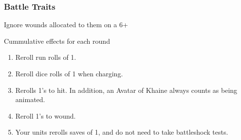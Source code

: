 \hypertarget{battle-traits}{%
    \subsubsection{Battle Traits}\label{battle-traits}}
\begin{description}[align=left]
    \item [\htarget{fanatical-faith}{Fanatical Faith}] Ignore wounds allocated to them on a 6+
\item [Blood Rites] Cummulative effects for each round
  \begin{enumerate}
  \item \textbf{} Reroll
      run rolls of 1.
  \item \textbf{} Reroll dice rolls of
      1 when charging.
  \item \textbf{} Rerolls 1's to hit. In
      addition, an Avatar of Khaine always counts as being animated.
  \item \textbf{} Reroll
      1's to wound.
  \item \textbf{} Your
      units rerolls saves of 1, and do not need to take battleshock tests.
  \end{enumerate}
\end{description}

